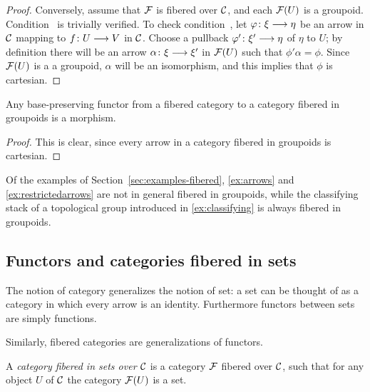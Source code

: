 \begin{3   FIBERED CATEGORIES}
\begin{3.3 Categories fibered in groupoids}
\begin{proof}
Conversely, assume that $\mathcal{F}$ is fibered over $\mathcal{C}$, and each $\mathcal{F}(U)$ is a groupoid. Condition~ is trivially verified. To check condition~, let $\phi\colon \xi \arr \eta$ be an arrow in $\mathcal{C}$ mapping to $f \colon U \arr V$ in $\mathcal{C}$. Choose a pullback $\phi'\colon \xi' \arr \eta$ of $\eta$ to $U$; by definition there will be an arrow $\alpha \colon \xi \arr \xi'$ in $\mathcal{F}(U)$ such that $\phi'\alpha = \phi$. Since $\mathcal{F}(U)$ is a a groupoid, $\alpha$ will be an isomorphism, and this implies that $\phi$ is cartesian.
\end{proof}


\begin{corollary} Any base-preserving functor from a fibered category to a category fibered in groupoids is a morphism.
\end{corollary}

\begin{proof} This is clear, since every arrow in a category fibered in groupoids is cartesian.
\end{proof}

Of the examples of Section~\ref{sec:examples-fibered}, \ref{ex:arrows} and \ref{ex:restrictedarrows} are not in general fibered in groupoids, while the classifying stack of a topological group introduced in \ref{ex:classifying} is always fibered in groupoids.



\end{3.3 Categories fibered in groupoids}
\begin{3.4 Functors and cats fibered in sets}
\setcounter{section}{3}
\section{Functors and categories fibered in sets}\label{sec:fiberedsets}
\setcounter{theorem}{23}
The notion of category generalizes the notion of set: a set can be thought of as a category in which every arrow is an identity. Furthermore functors between sets are simply functions.

Similarly, fibered categories are generalizations of functors.

\begin{definition} A \emph{category fibered in sets over $\mathcal{C}$}%
%
 is a category $\mathcal{F}$ fibered over $\mathcal{C}$, such that for any object $U$ of $\mathcal{C}$ the category $\mathcal{F}(U)$ is a set.
\end{definition}


\end{3.4 Functors and cats fibered in sets}
\end{3   FIBERED CATEGORIES}
